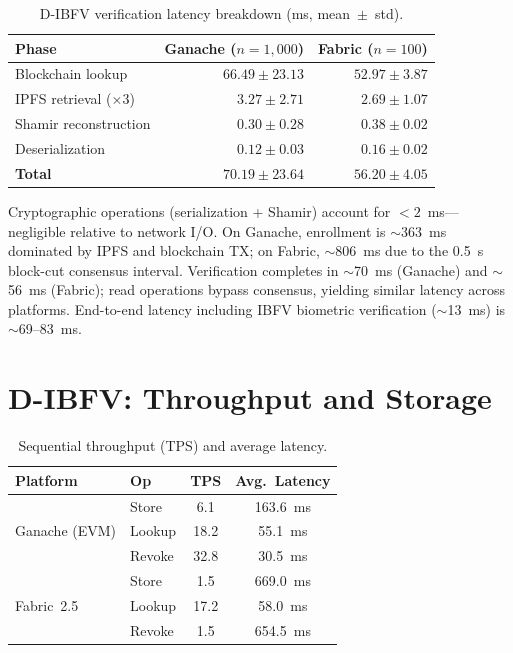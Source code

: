 \begin{table}[h]
\centering
\caption{D-IBFV verification latency breakdown (ms, mean~$\pm$~std).}
\label{tab:verification_latency}
\small
\begin{tabular}{@{}l rr@{}}
\toprule
\textbf{Phase} & \textbf{Ganache ($n=1{,}000$)} & \textbf{Fabric ($n=100$)} \\
\midrule
Blockchain lookup         & $66.49 \pm 23.13$ & $52.97 \pm 3.87$ \\
IPFS retrieval ($\times 3$) & $3.27 \pm 2.71$ & $2.69 \pm 1.07$ \\
Shamir reconstruction     & $0.30 \pm 0.28$   & $0.38 \pm 0.02$ \\
Deserialization           & $0.12 \pm 0.03$   & $0.16 \pm 0.02$ \\
\midrule
\textbf{Total}            & $\mathbf{70.19 \pm 23.64}$ & $\mathbf{56.20 \pm 4.05}$ \\
\bottomrule
\end{tabular}
\end{table}

Cryptographic operations (serialization + Shamir) account for $< 2$~ms---negligible
relative to network I/O. On Ganache, enrollment is $\sim$363~ms dominated by IPFS
and blockchain TX; on Fabric, $\sim$806~ms due to the 0.5~s block-cut consensus
interval. Verification completes in $\sim$70~ms (Ganache) and $\sim$56~ms (Fabric);
read operations bypass consensus, yielding similar latency across platforms.
End-to-end latency including IBFV biometric verification ($\sim$13~ms) is $\sim$69--83~ms.

\section{D-IBFV: Throughput and Storage}
\label{sec:dibfv_sys}

\begin{table}[h]
\centering
\caption{Sequential throughput (TPS) and average latency.}
\label{tab:throughput}
\small
\begin{tabular}{@{}llcc@{}}
\toprule
\textbf{Platform} & \textbf{Op} & \textbf{TPS} & \textbf{Avg.\ Latency} \\
\midrule
\multirow{3}{*}{Ganache (EVM)} & Store  & 6.1  & 163.6~ms \\
 & Lookup & 18.2 & 55.1~ms \\
 & Revoke & 32.8 & 30.5~ms \\
\midrule
\multirow{3}{*}{Fabric~2.5} & Store  & 1.5  & 669.0~ms \\
 & Lookup & 17.2 & 58.0~ms \\
 & Revoke & 1.5  & 654.5~ms \\
\bottomrule
\end{tabular}
\end{table}

